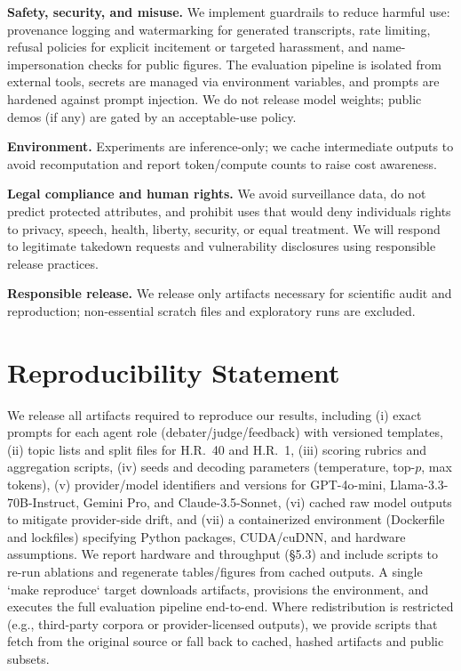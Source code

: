 \documentclass[11pt]{article}
\begin{document}
\textbf{Safety, security, and misuse.} We implement guardrails to reduce harmful use: provenance logging and watermarking for generated transcripts, rate limiting, refusal policies for explicit incitement or targeted harassment, and name-impersonation checks for public figures. The evaluation pipeline is isolated from external tools, secrets are managed via environment variables, and prompts are hardened against prompt injection. We do not release model weights; public demos (if any) are gated by an acceptable-use policy.

\textbf{Environment.} Experiments are inference-only; we cache intermediate outputs to avoid recomputation and report token/compute counts to raise cost awareness.

\textbf{Legal compliance and human rights.} We avoid surveillance data, do not predict protected attributes, and prohibit uses that would deny individuals rights to privacy, speech, health, liberty, security, or equal treatment. We will respond to legitimate takedown requests and vulnerability disclosures using responsible release practices.

\textbf{Responsible release.} We release only artifacts necessary for scientific audit and reproduction; non-essential scratch files and exploratory runs are excluded.


\section*{Reproducibility Statement}
We release all artifacts required to reproduce our results, including (i) exact prompts for each agent role (debater/judge/feedback) with versioned templates, (ii) topic lists and split files for H.R.~40 and H.R.~1, (iii) scoring rubrics and aggregation scripts, (iv) seeds and decoding parameters (temperature, top-$p$, max tokens), (v) provider/model identifiers and versions for GPT-4o-mini, Llama-3.3-70B-Instruct, Gemini Pro, and Claude-3.5-Sonnet, (vi) cached raw model outputs to mitigate provider-side drift, and (vii) a containerized environment (Dockerfile and lockfiles) specifying Python packages, CUDA/cuDNN, and hardware assumptions. We report hardware and throughput (\S5.3) and include scripts to re-run ablations and regenerate tables/figures from cached outputs. A single `make reproduce` target downloads artifacts, provisions the environment, and executes the full evaluation pipeline end-to-end. Where redistribution is restricted (e.g., third-party corpora or provider-licensed outputs), we provide scripts that fetch from the original source or fall back to cached, hashed artifacts and public subsets.
\end{document}
